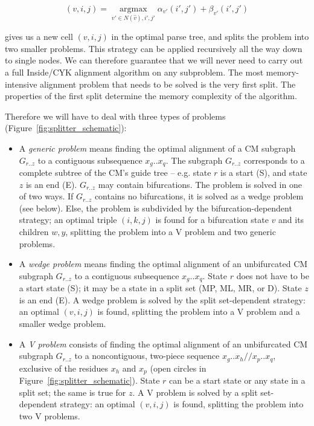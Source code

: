 \documentclass[11pt]{article}
\def\argmax{\mathop{\mathrm{argmax}}\limits}
\begin{document}
\[
(v,i,j) = \argmax_{v' \in N(\hat{v}),i',j'} \alpha_{v'}(i',j') + \beta_{v'}(i',j')
\]

gives us a new cell $(v,i,j)$ in the optimal parse tree, and splits
the problem into two smaller problems. This strategy can be applied
recursively all the way down to single nodes. We can therefore
guarantee that we will never need to carry out a full Inside/CYK
alignment algorithm on any subproblem. The most memory-intensive
alignment problem that needs to be solved is the very first split.
The properties of the first split determine the memory complexity of
the algorithm.

Therefore we will have to deal with three types of problems
(Figure~\ref{fig:splitter_schematic}):

\begin{itemize}
\item A \emph{generic problem} means finding the optimal alignment of
a CM subgraph $G_{r..z}$ to a contiguous subsequence $x_g..x_q$. The
subgraph $G_{r..z}$ corresponds to a complete subtree of the CM's
guide tree -- e.g. state $r$ is a start (S), and state $z$ is an end
(E). $G_{r..z}$ may contain bifurcations. The problem is solved in one
of two ways. If $G_{r..z}$ contains no bifurcations, it is solved as a
wedge problem (see below). Else, the problem is subdivided by the
bifurcation-dependent strategy; an optimal triple $(i,k,j)$ is found
for a bifurcation state $v$ and its children $w,y$, splitting the
problem into a V problem and two generic problems.

\item A \emph{wedge problem} means finding the optimal alignment of an
unbifurcated CM subgraph $G_{r..z}$ to a contiguous subsequence
$x_g..x_q$. State $r$ does not have to be a start state (S); it may be
a state in a split set (MP, ML, MR, or D). State $z$ is an end (E).  A
wedge problem is solved by the split set-dependent strategy: an
optimal $(v,i,j)$ is found, splitting the problem into a V
problem and a smaller wedge problem.

\item A \emph{V problem} consists of finding the optimal alignment of
an unbifurcated CM subgraph $G_{r..z}$ to a noncontiguous, two-piece
sequence $x_g..x_h//x_p..x_q$, exclusive of the residues $x_h$ and
$x_p$ (open circles in Figure~\ref{fig:splitter_schematic}).  State
$r$ can be a start state or any state in a split set; the same is true
for $z$. A V problem is solved by a split set-dependent strategy: an
optimal $(v,i,j)$ is found, splitting the problem into two V problems.
\end{itemize}
\end{document}
